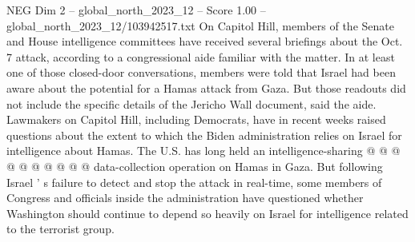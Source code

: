\begin{textsample}{NEG Dim 2 – global\_north\_2023\_12 – Score 1.00 – global\_north\_2023\_12/103942517.txt}
On Capitol Hill, members of the Senate and House intelligence committees have received several briefings about the Oct. 7 attack, according to a congressional aide familiar with the matter.
In at least one of those closed-door conversations, members were told that Israel had been aware about the potential for a Hamas attack from Gaza.
But those readouts did not include the specific details of the Jericho Wall document, said the aide.
Lawmakers on Capitol Hill, including Democrats, have in recent weeks raised questions about the extent to which the Biden administration relies on Israel for intelligence about Hamas.
The U.S. has long held an intelligence-sharing @ @ @ @ @ @ @ @ @ @ data-collection operation on Hamas in Gaza.
But following Israel ' s failure to detect and stop the attack in real-time, some members of Congress and officials inside the administration have questioned whether Washington should continue to depend so heavily on Israel for intelligence related to the terrorist group.

\end{textsample}
